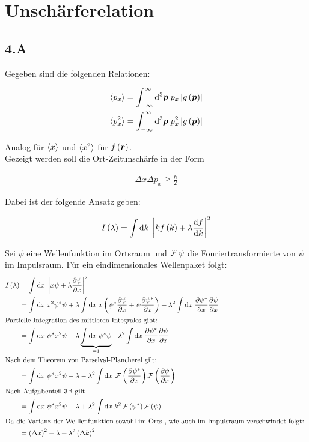 \documentclass[11pt, ngerman, fleqn, DIV=15, headinclude]{scrartcl}
\newcommand{\abs}[1]{\left\lvert#1\right\rvert}
\begin{document}
\section{Unschärferelation}

\subsection*{4.A}

Gegeben sind die folgenden Relationen:

\begin{align*}
	\braket{p_x} &= \int_{-\infty}^{\infty} \dif^3\vec{p}\; p_x \abs{g\del{\vec{p}}}\\
	\braket{p_x^2} &= \int_{-\infty}^{\infty} \dif^3\vec{p}\; p_x^2 \abs{g\del{\vec{p}}}
\end{align*}

Analog für $\langle x \rangle$ und $\langle x^2 \rangle$ für $f\left( \boldsymbol{r} \right)$.\\

Gezeigt werden soll die Ort-Zeitunschärfe in der Form

\begin{align*}
	\Delta x\Delta p_x \geq \frac{\hbar}{2}
\end{align*}

Dabei ist der folgende Ansatz geben:

\begin{align*}
	I\del{\lambda} = \int \dif k\; \abs{kf\del{k}+\lambda\od{f}{k}}^2
\end{align*}

Sei $\psi$ eine Wellenfunktion im Ortsraum und $\operatorname{\mathcal{F}}\psi$ die Fouriertransformierte von $\psi$ im Impulsraum. Für ein eindimensionales Wellenpaket folgt:
\begin{align*}
	I\del{\lambda} 	&= \int\dif x\; \abs{x\psi + \lambda\pd{\psi}{x}}^2  \\
					&= \int\dif x\; x^2\psi^*\psi + \lambda \int\dif x\; x\del{\psi^*\pd{\psi}{x} + \psi\pd{\psi^*}{x}} + \lambda^2 \int\dif x\; \pd{\psi^*}{x}\pd{\psi}{x}\\
	\intertext{%
		Partielle Integration des mittleren Integrales gibt:
	}
					&= \int\dif x\; \psi^*x^2\psi - \lambda \underbrace{\int\dif x\; \psi^*\psi}_{=1} - \lambda^2 \int\dif x\; \pd{\psi^*}{x}\pd{\psi}{x}\\
	\intertext{%
		Nach dem Theorem von Parselval-Plancherel gilt:
	}
					&= \int\dif x\; \psi^*x^2\psi - \lambda - \lambda^2 \int\dif x\; \fourier\del{\pd{\psi^*}{x}}\fourier\del{\pd{\psi}{x}}\\
	\intertext{%
		Nach Aufgabenteil 3B gilt
	}
					&= \int\dif x\; \psi^*x^2\psi - \lambda + \lambda^2 \int\dif x\; k^2\fourier\del{\psi^*}\fourier\del{\psi}\\
	\intertext{%
		Da die Varianz der Welllenfunktion sowohl im Orts-, wie auch im Impulsraum verschwindet folgt:
	}
					&= \del{\Delta x}^2 - \lambda + \lambda^2 \del{\Delta k}^2\\
\end{align*}
\end{document}
